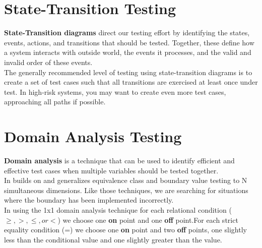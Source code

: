 \documentclass{article}
\begin{document}
\section*{State-Transition Testing}
\textbf{State-Transition diagrams} direct our testing effort by identifying the states, events, actions, and transitions that should be tested. Together, these define how a system interacts with outside world, the events it processes, and the valid and invalid order of these events.
\\
The generally recommended level of testing using state-transition diagrams is to create a set of test cases such that all transitions are exercised at least once under test. In high-risk systems, you may want to create even more test cases, approaching all paths if possible.

\section*{Domain Analysis Testing}
\textbf{Domain analysis} is a technique that can be used to identify efficient and effective test cases when multiple variables should be tested together.
\\
In builds on and generalizes equivalence class and boundary value testing to N simultaneous dimensions. Like those techniques, we are searching for situations where the boundary has been implemented incorrectly.
\\
In using the 1x1 domain analysis technique for each relational condition ($\geq, >, \leq, or <$) we choose one \textbf{on} point and one \textbf{off} point.For each strict equality condition (=) we choose one \textbf{on} point and two \textbf{off} points, one slightly less than the conditional value and one slightly greater than the value.
\end{document}
